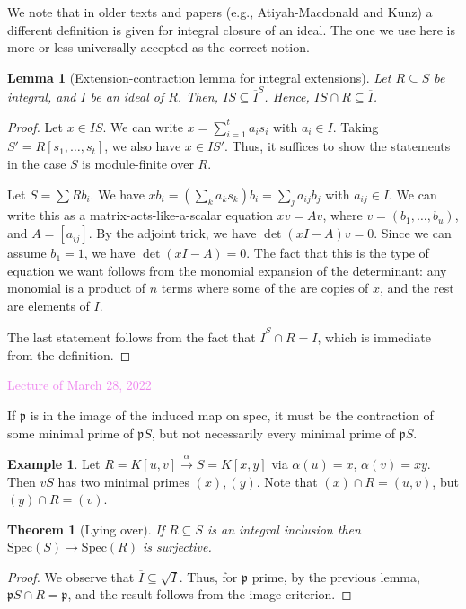 \documentclass{amsart}[12pt]
\newcommand{\Mar}[1]{\textcolor{violet}{Lecture of March #1, 2022}}
\newcommand{\p}{{\mathfrak p}}
\numberwithin{equation}{section}
\theoremstyle{plain} %
\newtheorem{theorem}[equation]{Theorem}
\newtheorem{lemma}[equation]{Lemma}
\theoremstyle{definition}
\newtheorem{ex}[equation]{Example}
\theoremstyle{remark}
\newcommand{\xra}[1]{\xrightarrow{#1}}
\newcommand{\Spec}{\mathrm{Spec}}
\begin{document}
We note that in older texts and papers (e.g., Atiyah-Macdonald and Kunz) a different definition is given for integral closure of an ideal. The one we use here is more-or-less universally accepted as the correct notion.

\begin{lemma}[Extension-contraction lemma for integral extensions] Let $R \subseteq S$ be integral, and $I$ be an ideal of $R$. Then, $IS \subseteq\overline{I}^S$. Hence, $I S \cap R \subseteq \overline{I}$.
\end{lemma}
\begin{proof}
Let $x\in IS$. We can write $x = \sum_{i=1}^t a_i s_i$ with $a_i\in I$. Taking $S'=R[s_1,\dots,s_t]$, we also have $x\in IS' $. Thus, it suffices to show the statements in the case $S$ is module-finite over $R$.

Let $S=\sum R b_i$. We have $x b_i = (\sum_k a_k s_k) b_i = \sum_j a_{ij} b_j$ with $a_{ij}\in I$. We can write this as a matrix-acts-like-a-scalar equation $x v = Av$, where $v=(b_1,\dots,b_u)$, and $A=[a_{ij}]$. By the adjoint trick, we have $\det(xI-A)v=0$. Since we can assume $b_1=1$, we have $\det(xI-A)=0$. The fact that this is the type of equation we want follows from the monomial expansion of the determinant: any monomial is a product of $n$ terms where some of the are copies of $x$, and the rest are elements of $I$.

The last statement follows from the fact that $\overline{I}^S \cap R = \overline{I}$, which is immediate from the definition.
\end{proof}

\Mar{28}

If $\p$ is in the image of the induced map on spec, it must be the contraction of some minimal prime of $\p S$, but not necessarily every minimal prime of $\p S$.

\begin{ex} Let $R=K[u,v] \xra{\alpha} S=K[x,y]$ via $\alpha(u)=x$, $\alpha(v)=xy$. Then $vS$ has two minimal primes $(x), (y)$. Note that $(x) \cap R = (u,v)$, but $(y) \cap R = (v)$.
\end{ex}

\begin{theorem}[Lying over] If $R\subseteq S$ is an integral inclusion then $\Spec(S) \to \Spec(R)$ is surjective.
\end{theorem}
\begin{proof}
 We observe that $\overline{I} \subseteq \sqrt{I}$. Thus, for $\p$ prime, by the previous lemma, $\p S \cap R = \p$, and the result follows from the image criterion.
\end{proof}
\end{document}
